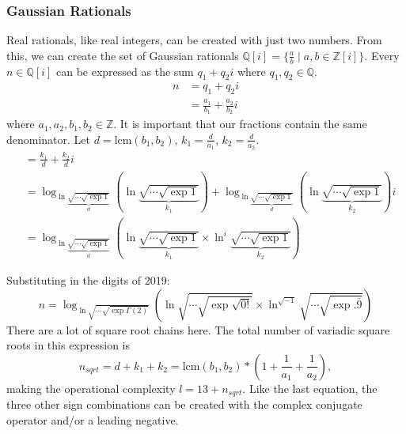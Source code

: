 \subsubsection{Gaussian Rationals}
Real rationals, like real integers, can be created with just two numbers.
From this, we can create the set of Gaussian rationals $\mathbb{Q}[i]=\{\frac{a}{b}\mid a,b\in\mathbb{Z}[i]\}$.
Every $n\in\mathbb{Q}[i]$ can be expressed as the sum $q_1+q_2i$ where $q_1,q_2\in\mathbb{Q}$.
\begin{align*}
  n &= q_1+q_2i \\
  &= \frac{a_1}{b_1} + \frac{a_2}{b_2}i
\end{align*}
where $a_1, a_2, b_1, b_2\in\mathbb{Z}$.
It is important that our fractions contain the same denominator.
Let $d=\textrm{lcm}(b_1, b_2)$, $k_1=\frac{d}{a_1}$, $k_2=\frac{d}{a_2}$.
\begin{align*}
  &= \frac{k_1}{d} + \frac{k_2}{d}i \\
  &= \log_{
      \ln \underbrace{\sqrt{\cdots\sqrt{\exp1}}}_{d}
    }
    \left(
      \ln \underbrace{\sqrt{\cdots\sqrt{\exp1}}}_{k_1}
    \right) +
    \log_{
      \ln \underbrace{\sqrt{\cdots\sqrt{\exp1}}}_{d}
    }
    \left(
      \ln \underbrace{\sqrt{\cdots\sqrt{\exp1}}}_{k_2}
    \right)i \\
  &= \log_{
      \ln \underbrace{\sqrt{\cdots\sqrt{\exp1}}}_{d}
    }
    \left(
      \ln \underbrace{\sqrt{\cdots\sqrt{\exp1}}}_{k_1}
      \times
      \ln^{i} \underbrace{\sqrt{\cdots\sqrt{\exp1}}}_{k_2}
    \right)
\end{align*}

Substituting in the digits of 2019:
\begin{equation}
  n = \log_{\ln \sqrt{\cdots\sqrt{\exp\Gamma(2)}}}
    \left(
      \ln \sqrt{\cdots\sqrt{\exp\sqrt{0!}}}
      \times
      \ln^{\sqrt{-1}} \sqrt{\cdots\sqrt{\exp .\overline{9}}}
    \right)
\end{equation}
There are a lot of square root chains here.
The total number of variadic square roots in this expression is
\begin{equation*}
  n_{sqrt}=d+k_1+k_2=\textrm{lcm}(b_1,b_2) * \left(1+\frac{1}{a_1}+\frac{1}{a_2}\right),
\end{equation*}
making the operational complexity $l=13+n_{sqrt}$.
Like the last equation, the three other sign combinations can be created with the complex conjugate operator and/or a leading negative.
